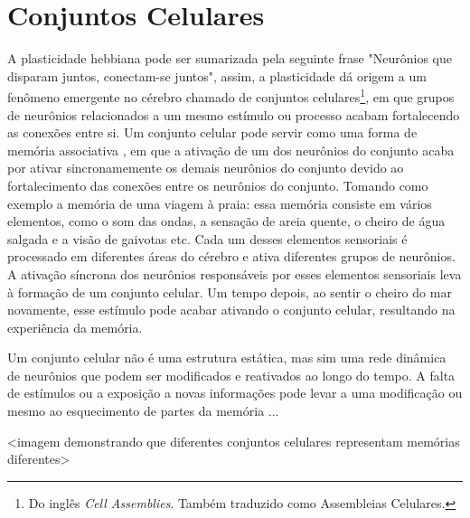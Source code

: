 \section{Conjuntos Celulares}

A plasticidade hebbiana pode ser sumarizada pela seguinte frase "Neurônios que disparam juntos, conectam-se juntos", assim, a
plasticidade dá origem a um fenômeno emergente no cérebro chamado de conjuntos celulares\footnote{Do inglês \textit{Cell
Assemblies}. Também traduzido como Assembleias Celulares.}, em que grupos de neurônios relacionados a um mesmo estímulo ou
processo acabam fortalecendo as conexões entre si. Um conjunto celular pode servir como uma forma de memória associativa
\cite{sakuraiMultiple2018}, em que a ativação de um dos neurônios do conjunto acaba por ativar sincronamemente os demais neurônios
do conjunto devido ao fortalecimento das conexões entre os neurônios do conjunto. Tomando como exemplo a memória de uma viagem à
praia: essa memória consiste em vários elementos, como o som das ondas, a sensação de areia quente, o cheiro de água salgada e a
visão de gaivotas etc. Cada um desses elementos sensoriais é processado em diferentes áreas do cérebro e ativa diferentes grupos
de neurônios. A ativação síncrona dos neurônios responsáveis por esses elementos sensoriais leva à formação de um conjunto
celular. Um tempo depois, ao sentir o cheiro do mar novamente, esse estímulo pode acabar ativando o conjunto celular, resultando
na experiência da memória.

Um conjunto celular não é uma estrutura estática, mas sim uma rede dinâmica de neurônios que podem ser modificados e reativados ao
longo do tempo. A falta de estímulos ou a exposição a novas informações pode levar a uma modificação ou mesmo ao esquecimento de
partes da memória {...} 

<imagem demonstrando que diferentes conjuntos celulares representam memórias diferentes>